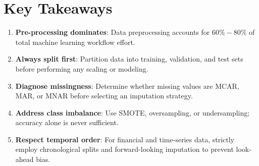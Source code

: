 \section{Key Takeaways}

\begin{takeawaybox}
\begin{enumerate}[leftmargin=1.2em, label=\roman*)]
    \item \textbf{Pre-processing dominates}: Data preprocessing accounts for $60\% - 80\%$ of total machine learning workflow effort.
    \item \textbf{Always split first}: Partition data into training, validation, and test sets before performing any scaling or modeling.
    \item \textbf{Diagnose missingness}: Determine whether missing values are MCAR, MAR, or MNAR before selecting an imputation strategy.
    \item \textbf{Address class imbalance}: Use SMOTE, oversampling, or undersampling; accuracy alone is never sufficient.
    \item \textbf{Respect temporal order}: For financial and time-series data, strictly employ chronological splits and forward-looking imputation to prevent look-ahead bias.
\end{enumerate}
\end{takeawaybox}
